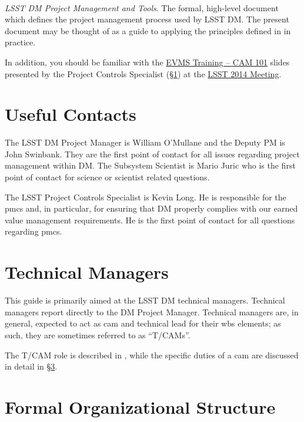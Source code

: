 \paragraph*{}
\emph{LSST DM Project Management and Tools}.
The formal, high-level document which defines the project management process used by LSST DM.
The present document may be thought of as a guide to applying the principles defined in  in practice.

In addition, you should be familiar with the \href{https://project.lsst.org/meetings/lsst2014/node/100}{EVMS Training -- CAM 101} slides presented by the Project Controls Specialist (\S\ref{sec:contacts}) at the \href{https://project.lsst.org/meetings/lsst2014/}{LSST 2014 Meeting}.

\section{Useful Contacts}
\label{sec:contacts}

The LSST DM Project Manager is William O'Mullane and the Deputy PM is John Swinbank.
They are the first point of contact for all issues regarding project management within DM.
The Subsystem Scientist is Mario Juric who is the first point of contact for science or scientist related questions.

The LSST Project Controls Specialist is Kevin Long.
He is responsible for the \gls{pmcs} and, in particular, for ensuring that DM properly complies with our earned value management requirements.
He is the first point of contact for all questions regarding \gls{pmcs}.

\section{Technical Managers}
\label{sec:tcam}

This guide is primarily aimed at the LSST DM technical managers.
Technical managers report directly to the DM Project Manager.
Technical managers are, in general, expected to act as \gls{cam} and technical lead for their \gls{wbs} \glspl{element}; as such, they are sometimes referred to as ``T/CAMs''.

The T/CAM role is described in , while the specific duties of a \gls{cam} are discussed in detail in \S\ref{sec:structure}.

\section{Formal Organizational Structure}
\label{sec:structure}

